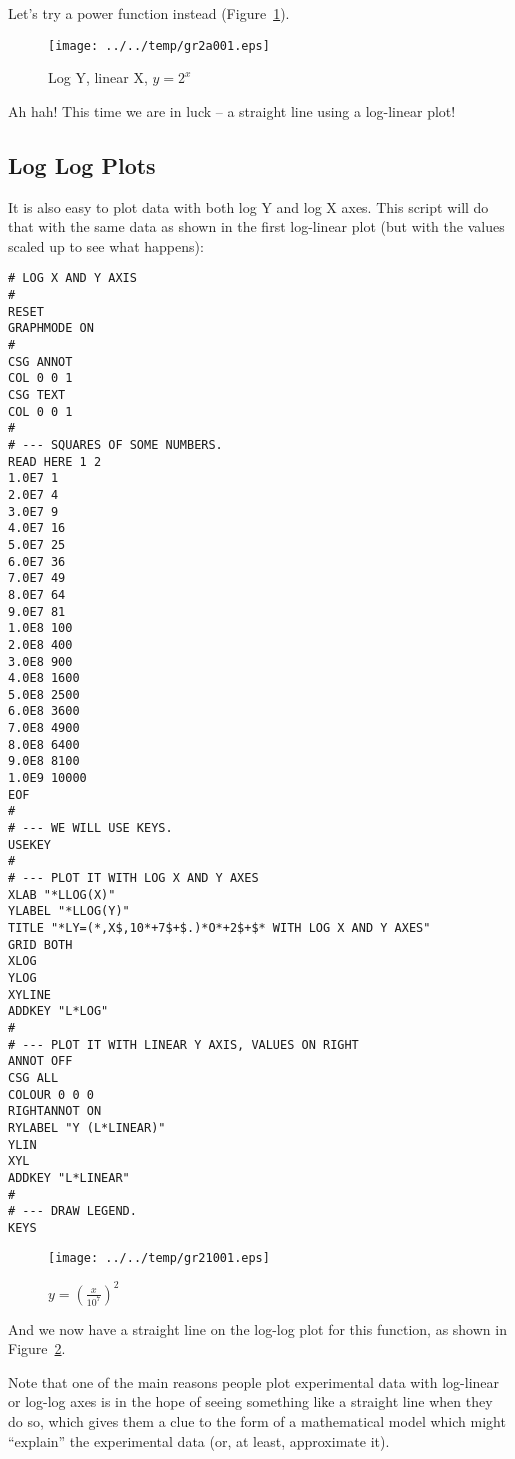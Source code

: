 \documentclass[a4paper,twoside,11pt]{article}
\makeatletter
\def\maxwidth{%
  \ifdim\Gin@nat@width>\linewidth
    \linewidth
  \else
    \Gin@nat@width
  \fi
}
\newcommand{\newpara}{\par\vspace{4mm}\noindent}
\makeatother
\begin{document}
\newpara
Let's try a power function instead (Figure~\ref{fig:gr2a001}).

\begin{figure}
  \centering
  \texttt{[image: ../../temp/gr2a001.eps]}
  \caption{Log Y, linear X, $y=2^x$}
  \label{fig:gr2a001}
\end{figure}

\newpara
Ah hah! This time we are in luck -- a straight line using a log-linear
plot!

\subsection{Log Log Plots}\label{log-log-plots}
\newpara
It is also easy to plot data with both log Y and log X axes. This script
will do that with the same data as shown in the first log-linear plot
(but with the values scaled up to see what happens):

\begin{lstlisting}
# LOG X AND Y AXIS
#
RESET
GRAPHMODE ON
#
CSG ANNOT
COL 0 0 1
CSG TEXT
COL 0 0 1
#
# --- SQUARES OF SOME NUMBERS.
READ HERE 1 2
1.0E7 1
2.0E7 4
3.0E7 9
4.0E7 16
5.0E7 25
6.0E7 36
7.0E7 49
8.0E7 64
9.0E7 81
1.0E8 100
2.0E8 400
3.0E8 900
4.0E8 1600
5.0E8 2500
6.0E8 3600
7.0E8 4900
8.0E8 6400
9.0E8 8100
1.0E9 10000
EOF
#
# --- WE WILL USE KEYS.
USEKEY
#
# --- PLOT IT WITH LOG X AND Y AXES
XLAB "*LLOG(X)"
YLABEL "*LLOG(Y)"
TITLE "*LY=(*,X$,10*+7$+$.)*O*+2$+$* WITH LOG X AND Y AXES"
GRID BOTH
XLOG
YLOG
XYLINE
ADDKEY "L*LOG"
#
# --- PLOT IT WITH LINEAR Y AXIS, VALUES ON RIGHT
ANNOT OFF
CSG ALL
COLOUR 0 0 0
RIGHTANNOT ON
RYLABEL "Y (L*LINEAR)"
YLIN
XYL
ADDKEY "L*LINEAR"
#
# --- DRAW LEGEND.
KEYS
\end{lstlisting}

\begin{figure}
  \centering
  \texttt{[image: ../../temp/gr21001.eps]}
  \caption{$y=\left(\frac{x}{10^7}\right)^2$}
  \label{fig:gr21001}
\end{figure}

\newpara
And we now have a straight line on the log-log plot for this function,
as shown in Figure~\ref{fig:gr21001}.

\newpara
Note that one of the main reasons people plot experimental data with
log-linear or log-log axes is in the hope of seeing something like a
straight line when they do so, which gives them a clue to the form of a
mathematical model which might ``explain'' the experimental data (or, at
least, approximate it).
\end{document}
